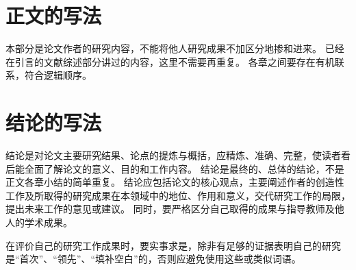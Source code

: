\section{正文的写法}

本部分是论文作者的研究内容，不能将他人研究成果不加区分地掺和进来。
已经在引言的文献综述部分讲过的内容，这里不需要再重复。
各章之间要存在有机联系，符合逻辑顺序。



\section{结论的写法}

结论是对论文主要研究结果、论点的提炼与概括，应精炼、准确、完整，使读者看后能全面了解论文的意义、目的和工作内容。
结论是最终的、总体的结论，不是正文各章小结的简单重复。
结论应包括论文的核心观点，主要阐述作者的创造性工作及所取得的研究成果在本领域中的地位、作用和意义，交代研究工作的局限，提出未来工作的意见或建议。
同时，要严格区分自己取得的成果与指导教师及他人的学术成果。

在评价自己的研究工作成果时，要实事求是，除非有足够的证据表明自己的研究是“首次”、“领先”、“填补空白”的，否则应避免使用这些或类似词语。
